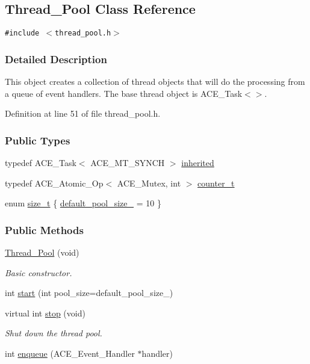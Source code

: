 \hypertarget{classThread__Pool}{
\subsection{Thread\_\-Pool Class Reference}
\label{classThread__Pool}
}
{\tt \#include $<$thread\_\-pool.h$>$}



\subsubsection{Detailed Description}
This object creates a collection of thread objects that will do the processing from a queue of event handlers. The base thread object is ACE\_\-Task$<$$>$. 



Definition at line 51 of file thread\_\-pool.h.\subsubsection*{Public Types}
\begin{CompactItemize}
\item 
typedef ACE\_\-Task$<$ ACE\_\-MT\_\-SYNCH $>$ \hyperlink{classThread__Pool_Thread__Pools0}{inherited}
\item 
typedef ACE\_\-Atomic\_\-Op$<$ ACE\_\-Mutex, int $>$ \hyperlink{classThread__Pool_Thread__Pools1}{counter\_\-t}
\item 
enum \hyperlink{classThread__Pool_Thread__Pools3}{size\_\-t} \{ \hyperlink{classThread__Pool_Thread__Pools3Thread__Pools2}{default\_\-pool\_\-size\_\-} =  10
 \}
\end{CompactItemize}
\subsubsection*{Public Methods}
\begin{CompactItemize}
\item 
\hyperlink{classThread__Pool_Thread__Poola0}{Thread\_\-Pool} (void)
\begin{CompactList}\small\item\em Basic constructor.\item\end{CompactList}\item 
int \hyperlink{classThread__Pool_Thread__Poola1}{start} (int pool\_\-size=default\_\-pool\_\-size\_\-)
\item 
virtual int \hyperlink{classThread__Pool_Thread__Poola2}{stop} (void)
\begin{CompactList}\small\item\em Shut down the thread pool.\item\end{CompactList}\item 
int \hyperlink{classThread__Pool_Thread__Poola3}{enqueue} (ACE\_\-Event\_\-Handler $\ast$handler)
\end{CompactItemize}
